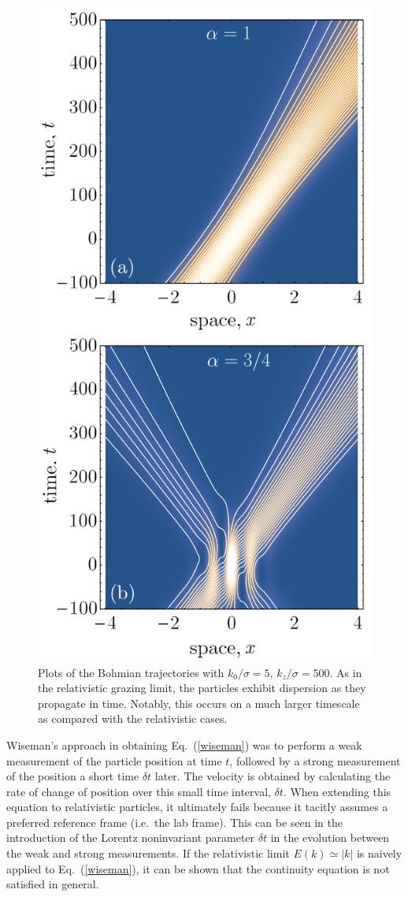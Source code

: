 \documentclass[
prx
,twocolumn
,nofootinbib
,floatfix
,superscriptaddress
]{revtex4-2}
\begin{document}
\begin{figure}[h]
    \centering
    \includegraphics[width=0.8\linewidth]{Fig3paraxialtrajectoriesb.png}
    \caption{Plots of the Bohmian trajectories with $k_0/\sigma = 5$, $k_z/\sigma = 500$. As in the relativistic grazing limit, the particles exhibit dispersion as they propagate in time. Notably, this occurs on a much larger timescale as compared with the relativistic cases.}
    \label{fig:paraxial}
\end{figure}
Wiseman's approach in obtaining Eq.\ (\ref{wiseman}) was to perform a weak measurement of the particle position at time $t$, followed by a strong measurement of the position a short time $\delta t$ later. The velocity is obtained by calculating the rate of change of position over this small time interval, $\delta t$. When extending this equation to relativistic particles, it ultimately fails because it tacitly assumes a preferred reference frame (i.e.\ the lab frame). This can be seen in the introduction of the Lorentz noninvariant parameter $\delta t$ in the evolution between the weak and strong measurements. If the relativistic limit $E(k) \simeq |k|$ is naively applied to Eq.\ (\ref{wiseman}), it can be shown that the continuity equation is not satisfied in general. 
\end{document}
